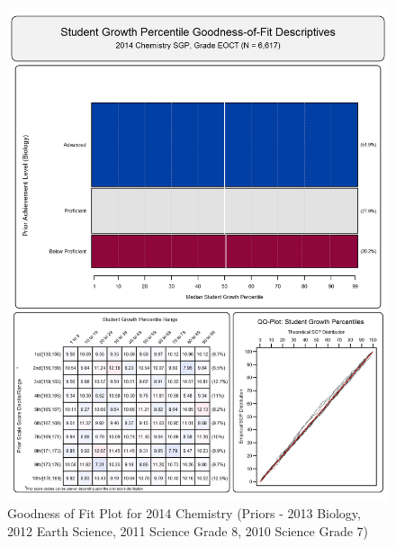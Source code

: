 \documentclass[12pt]{article}
\begin{document}
\begin{figure}[htbp]
\centering
\includegraphics{../img/Goodness_of_Fit/CHEMISTRY.2014/2014_CHEMISTRY_EOCT;2013_BIOLOGY_EOCT;2012_EARTH_SCIENCE_EOCT;2011_SCIENCE_8;2010_SCIENCE_7.png}
\caption{Goodness of Fit Plot for 2014 Chemistry (Priors - 2013 Biology,
2012 Earth Science, 2011 Science Grade 8, 2010 Science Grade 7)}
\end{figure}
\end{document}

